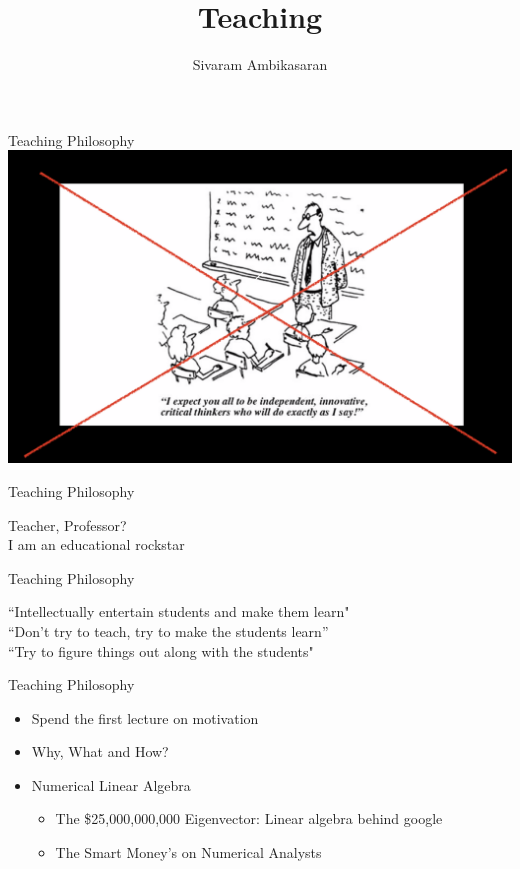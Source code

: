 \documentclass{beamer}
\title[Teaching]{Teaching}
\author[Sivaram Ambikasaran]{Sivaram Ambikasaran}
\institute[IITM]{Indian Institute of Technology Madras}
\begin{document}
\frame{\titlepage}


\begin{frame}{Teaching Philosophy}
	\includegraphics[width=\textwidth]{./images/Comic_Teaching.png}
\end{frame}

\begin{frame}[c]{Teaching Philosophy}
	\begin{center}
	\Huge{Teacher, Professor?}\\
	\pause
	\vspace{2em}
	\Huge{I am an {\color{cyan}educational} {\color{magenta}rockstar}}
	\end{center}
\end{frame}

\begin{frame}[c]{Teaching Philosophy}
	\LARGE
	\begin{center}
		``Intellectually entertain students and make them learn"\\
	\vspace{1em}
	``Don’t try to teach, try to make the students learn”\\
	\vspace{1em}
	``Try to figure things out along with the students"
	\end{center}
\end{frame}

\begin{frame}[c]{Teaching Philosophy}
	\LARGE
	\begin{itemize}
		\item
		Spend the first lecture on motivation
		\item
		Why, What and How?
		\item
		Numerical Linear Algebra
		\begin{itemize}
			\item
			The \$25,000,000,000 Eigenvector: Linear algebra behind google
			\item
			The Smart Money’s on Numerical Analysts
		\end{itemize}
	\end{itemize}
\end{frame}
\end{document}
